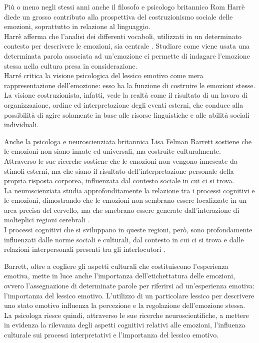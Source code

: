 Più o meno negli stessi anni anche il filosofo e psicologo britannico Rom Harrè diede un grosso contributo alla prospettiva del costruzionismo sociale delle emozioni, soprattutto in relazione al linguaggio.\\
Harrè afferma che l'analisi dei differenti vocaboli, utilizzati in un determinato contesto per descrivere le emozioni, sia centrale \parencite{harre}. Studiare come viene usata una determinata parola associata ad un'emozione ci permette di indagare l'emozione stessa nella cultura presa in considerazione.\\  
Harré critica la visione psicologica del lessico emotivo come mera rappresentazione dell'emozione: esso ha la funzione di costruire le emozioni stesse.\\
La visione costruzionista, infatti, vede la realtà come il risultato di un lavoro di organizzazione, ordine ed interpretazione degli eventi esterni, che conduce alla possibilità di agire solamente in base alle risorse linguistiche e alle abilità sociali individuali.
 
Anche la psicologa e neuroscienziata britannica Lisa Felman Barrett sostiene che le emozioni non siano innate ed universali, ma costruite culturalmente.\\
Attraverso le sue ricerche sostiene che le emozioni non vengono innescate da stimoli esterni, ma che siano il risultato dell'interpretazione personale della propria risposta corporea, influenzata dal contesto sociale in cui ci si trova.\\
La neuroscienziata studia approfonditamente la relazione tra i processi cognitivi e le emozioni, dimostrando che le emozioni non sembrano essere localizzate in un area precisa del cervello, ma che smebrano essere generate dall'interazione di molteplici regioni cerebrali \parencite{barrett_neuroscienze}. \\
I processi cognitivi che si sviluppano in queste regioni, però, sono profondamente influenzati dalle norme sociali e culturali, dal contesto in cui ci si trova e dalle relazioni interpersonali presenti tra gli interlocutori \parencite{barrett_costruzionismo}.

Barrett, oltre a cogliere gli aspetti culturali che costituiscono l'esperienza emotiva, mette in luce anche l'importanza dell'etichettatura delle emozioni, ovvero l'assegnazione di determinate parole per riferirsi ad un'esperienza emotiva: l'importanza del lessico emotivo. L'utilizzo di un particolare lessico per descrivere uno stato emotivo influenza la percezione e la regolazione dell'emozione stessa. \\
La psicologa riesce quindi, attraverso le sue ricerche neuroscientifiche, a mettere in evidenza la rilevanza degli aspetti cognitivi relativi alle emozioni, l'influenza culturale sui processi interpretativi e l'importanza del lessico emotivo.

